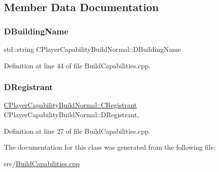\subsection{Member Data Documentation}
\hypertarget{classCPlayerCapabilityBuildNormal_aae09d6cee5f8e201a0139c9065a5577c}{}\label{classCPlayerCapabilityBuildNormal_aae09d6cee5f8e201a0139c9065a5577c} 
\subsubsection{\texorpdfstring{D\+Building\+Name}{DBuildingName}}
{\footnotesize\ttfamily std\+::string C\+Player\+Capability\+Build\+Normal\+::\+D\+Building\+Name\hspace{0.3cm}{\ttfamily [protected]}}



Definition at line 44 of file Build\+Capabilities.\+cpp.

\hypertarget{classCPlayerCapabilityBuildNormal_a486700cf2553e6ab77340152c9b03242}{}\label{classCPlayerCapabilityBuildNormal_a486700cf2553e6ab77340152c9b03242} 
\subsubsection{\texorpdfstring{D\+Registrant}{DRegistrant}}
{\footnotesize\ttfamily \hyperlink{classCPlayerCapabilityBuildNormal_1_1CRegistrant}{C\+Player\+Capability\+Build\+Normal\+::\+C\+Registrant} C\+Player\+Capability\+Build\+Normal\+::\+D\+Registrant\hspace{0.3cm}{\ttfamily [static]}, {\ttfamily [protected]}}



Definition at line 27 of file Build\+Capabilities.\+cpp.



The documentation for this class was generated from the following file\+:\begin{DoxyCompactItemize}
\item 
src/\hyperlink{BuildCapabilities_8cpp}{Build\+Capabilities.\+cpp}\end{DoxyCompactItemize}
